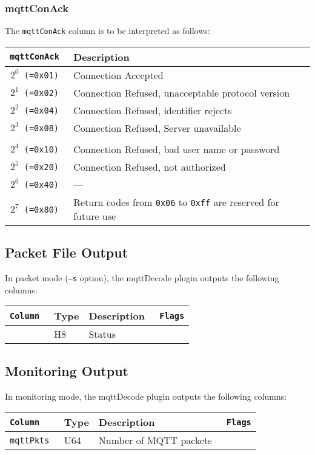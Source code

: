 \documentclass[documentation]{subfiles}
\begin{document}
\subsubsection{mqttConAck}\label{mqttConAck}
The {\tt mqttConAck} column is to be interpreted as follows:\\
\begin{longtable}{>{\tt}rl}
    \toprule
    {\bf mqttConAck} & {\bf Description}\\
    \midrule\endhead%
    $2^{0}$ (=0x01)  & Connection Accepted\\
    $2^{1}$ (=0x02)  & Connection Refused, unacceptable protocol version\\
    $2^{2}$ (=0x04)  & Connection Refused, identifier rejects\\
    $2^{3}$ (=0x08)  & Connection Refused, Server unavailable\\
    \\
    $2^{4}$ (=0x10)  & Connection Refused, bad user name or password\\
    $2^{5}$ (=0x20)  & Connection Refused, not authorized\\
    $2^{6}$ (=0x40)  & ---\\
    $2^{7}$ (=0x80)  & Return codes from {\tt 0x06} to {\tt 0xff} are reserved for future use\\
    \bottomrule
\end{longtable}

\subsection{Packet File Output}
In packet mode ({\tt --s} option), the mqttDecode plugin outputs the following columns:
\begin{longtable}{>{\tt}lll>{\tt\small}l}
    \toprule
    {\bf Column}       & {\bf Type} & {\bf Description} & {\bf Flags}\\
    \midrule\endhead%
    \nameref{mqttStat} & H8         & Status            & \\
    \bottomrule
\end{longtable}

\subsection{Monitoring Output}
In monitoring mode, the mqttDecode plugin outputs the following columns:
\begin{longtable}{>{\tt}lll>{\tt\small}l}
    \toprule
    {\bf Column} & {\bf Type} & {\bf Description}      & {\bf Flags}\\
    \midrule\endhead%
    mqttPkts     & U64        & Number of MQTT packets & \\
    \bottomrule
\end{longtable}
\end{document}
